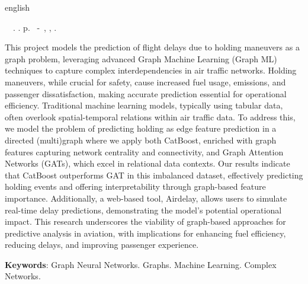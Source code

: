 \begin{resumo}[Abstract]
\begin{otherlanguage*}{english}
	\begin{flushleft} 
			\setlength{\absparsep}{0pt} %
			\SingleSpacing 
			\imprimirautorabr~~\textbf{\imprimirtituloresumo}.	\imprimirdata. \pageref{LastPage}p. 
			\imprimirtipotrabalho~-~\imprimirinstituicao, \imprimirlocal, \imprimirdata. 
 	\end{flushleft}
\OnehalfSpacing
	
This project models the prediction of flight delays due to holding maneuvers as a graph problem, leveraging advanced Graph Machine Learning (Graph ML) techniques to capture complex interdependencies in air traffic networks. Holding maneuvers, while crucial for safety, cause increased fuel usage, emissions, and passenger dissatisfaction, making accurate prediction essential for operational efficiency. Traditional machine learning models, typically using tabular data, often overlook spatial-temporal relations within air traffic data. To address this, we model the problem of predicting holding as edge feature prediction in a directed (multi)graph where we apply both CatBoost, enriched with graph features capturing network centrality and connectivity, and Graph Attention Networks (GATs), which excel in relational data contexts. Our results indicate that CatBoost outperforms GAT in this imbalanced dataset, effectively predicting holding events and offering interpretability through graph-based feature importance. Additionally, a web-based tool, Airdelay, allows users to simulate real-time delay predictions, demonstrating the model's potential operational impact. This research underscores the viability of graph-based approaches for predictive analysis in aviation, with implications for enhancing fuel efficiency, reducing delays, and improving passenger experience.

   \vspace{\onelineskip}
 
   \noindent 
   \textbf{Keywords}: Graph Neural Networks. Graphs. Machine Learning. Complex Networks.
 \end{otherlanguage*}
\end{resumo}
